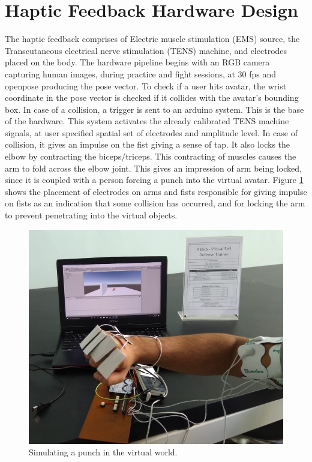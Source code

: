 \section{Haptic Feedback Hardware Design}

The haptic feedback comprises of Electric muscle stimulation (EMS) source, the Transcutaneous electrical nerve stimulation (TENS) machine, and electrodes placed on the body. The hardware pipeline begins with an RGB camera capturing human images, during practice and fight sessions, at 30 fps and openpose producing the pose vector. To check if a user hits avatar, the wrist coordinate in the pose vector is checked if it collides with the avatar's bounding box. In case of a collision, a trigger is sent to an arduino system. This is the base of the hardware. This system activates the already calibrated TENS machine signals, at user specified spatial set of electrodes and amplitude level. In case of collision, it gives an impulse on the fist giving a sense of tap. It also locks the elbow by contracting the biceps/triceps. This contracting of muscles causes the arm to fold across the elbow joint. This gives an impression of arm being locked, since it is coupled with a person forcing a punch into the virtual avatar. Figure \ref{fig:punchSimulation} shows the placement of electrodes on arms and fists responsible for giving impulse on fists as an indication that some collision has occurred, and for locking the arm to prevent penetrating into the virtual objects. 

\begin{figure}
    \centering
    \includegraphics[scale=.7]{images/haptics/setup.jpg}
    \caption{Simulating a punch in the virtual world.}
    \label{fig:punchSimulation}
\end{figure}


